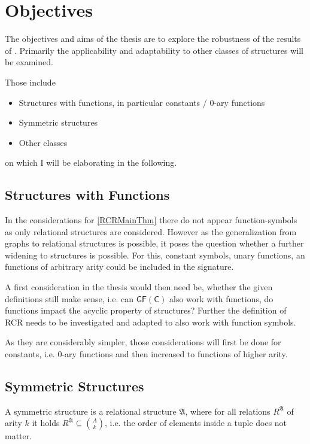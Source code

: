 \documentclass[a4paper,11pt,DIV=15]{scrartcl} %
\theoremstyle{plain}
\theoremstyle{definition}
\begin{document}
\section{Objectives}

The objectives and aims of the thesis are to explore the robustness of the results of \cite{scheidt2024color}. Primarily the applicability and adaptability to other classes of structures will be examined.

Those include
\begin{itemize}
	\item Structures with functions, in particular constants / $0$-ary functions
	\item Symmetric structures
	\item Other classes
\end{itemize}
on which I will be elaborating in the following.

\subsection{Structures with Functions}

In the considerations for \cref{RCRMainThm} there do not appear function-symbols as only relational structures are considered.
However as the generalization from graphs to relational structures is possible, it poses the question whether a further widening to structures is possible.
For this, constant symbols, unary functions, an functions of arbitrary arity could be included in the signature.

A first consideration in the thesis would then need be, whether the given definitions still make sense, i.e. can $\mathsf{GF(C)}$ also work with functions, do functions impact the acyclic property of structures?
Further the definition of RCR needs to be investigated and adapted to also work with function symbols.

As they are considerably simpler, those considerations will first be done for constants, i.e. $0$-ary functions and then increased to functions of higher arity.
\label{StructWFunc}

\subsection{Symmetric Structures}

A symmetric structure is a relational structure $\mathfrak A$, where for all relations $R^\mathfrak A$ of arity $k$ it holds $R^\mathfrak A \subseteq \binom{A}{k}$, i.e. the order of elements inside a tuple does not matter.
\end{document}

